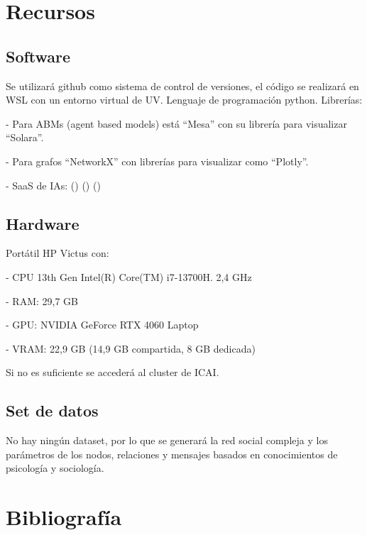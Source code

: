 \documentclass[12pt]{extarticle}
\numberwithin{equation}{section}
\begin{document}
\section{Recursos} \label{sec:resources}

\subsection{Software} \label{sec:resources_software}
Se utilizará github como sistema de control de versiones, el código se realizará en WSL con un entorno virtual de UV. Lenguaje de programación python. Librerías:

- Para ABMs (agent based models)  está ``Mesa'' con su librería para visualizar ``Solara''.

- Para grafos ``NetworkX'' con librerías para visualizar como ``Plotly''.

- SaaS de IAs: (\cite{Perplexity}) (\cite{Gemini}) (\cite{ChatGPT})

\subsection{Hardware} \label{sec:resources_hardware}
Portátil HP Victus con: \vspace{1em}

- CPU 13th Gen Intel(R) Core(TM) i7-13700H. 2,4 GHz \vspace{1em}

- RAM: 29,7 GB \vspace{1em}

- GPU: NVIDIA GeForce RTX 4060 Laptop \vspace{1em}

- VRAM: 22,9 GB (14,9 GB compartida, 8 GB dedicada) \vspace{1em}

Si no es suficiente se accederá al cluster de ICAI.

\subsection{Set de datos} \label{sec:resources_datasets}
No hay ningún dataset, por lo que se generará la red social compleja y los parámetros de los nodos, relaciones y mensajes basados en conocimientos de psicología y sociología.

\newpage 

\section{Bibliografía} \label{sec:bibliography}

\printbibliography[type=article, title={Artículos Científicos}, heading=subbibliography]

\printbibliography[type=book, title={Libros}, heading=subbibliography]

\printbibliography[subtype={video}, title={Material Audiovisual}]

\printbibliography[subtype={IA}, title={Herramientas de IA}]
\end{document}
